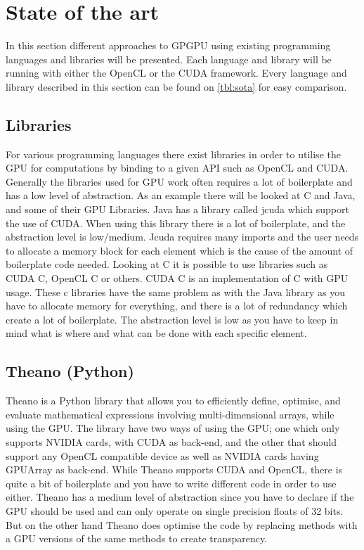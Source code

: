 \section{State of the art} %
\label{sec:state_of_the_art}
In this section different approaches to GPGPU using existing programming languages and libraries will be presented.
Each language and library will be running with either the OpenCL or the CUDA framework.
Every language and library described in this section can be found on \ref{tbl:sota} for easy comparison.
      
\subsection{Libraries} 
For various programming languages there exist libraries in order to utilise the GPU for computations by binding to a given API such as OpenCL and CUDA.
Generally the libraries used for GPU work often requires a lot of boilerplate and has a low level of abstraction.
As an example there will be looked at C and Java, and some of their GPU Libraries.
Java has a library called jcuda which support the use of CUDA.
When using this library there is a lot of boilerplate, and the abstraction level is low/medium\citep{Java_library}. 
Jcuda requires many imports and the user needs to allocate a memory block for each element which is the cause of the amount of boilerplate code needed.\citep{Java_malloc}
Looking at C it is possible to use libraries such as CUDA C, OpenCL C or others.
CUDA C is an implementation of C with GPU usage.
These c libraries have the same problem as with the Java library as you have to allocate memory for everything, and there is a lot of redundancy which create a lot of boilerplate.
The abstraction level is low as you have to keep in mind what is where and what can be done with each specific element.\citep{C_CUDA}                                                  

\subsection{Theano (Python)}
Theano is a Python library that allows you to efficiently define, optimise, and evaluate mathematical expressions involving multi-dimensional arrays, while using the GPU.
The library have two ways of using the GPU; one which only supports NVIDIA cards, with CUDA as back-end, and the other that should support any OpenCL compatible device as well as NVIDIA cards having GPUArray as back-end.
While Theano supports CUDA and OpenCL, there is quite a bit of boilerplate and you have to write different code in order to use either.
Theano has a medium level of abstraction since you have to declare if the GPU should be used and can only operate on single precision floats of 32 bits.
But on the other hand Theano does optimise the code by replacing methods with a GPU versions of the same methods to create transparency.\citep{Theano,Theano_GPU}

